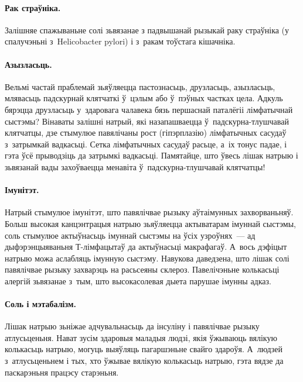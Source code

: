 \paragraph{Рак страўніка.}
Залішняе спажываньне солі зьвязанае з падвышанай рызыкай раку страўніка (у спалучэньні з~He\-li\-co\-bac\-ter pylori) і з~ракам тоўстага кішачніка.

\paragraph{Азызласьць.}
Вельмі частай праблемай зьяўляецца пастознасьць, друзласьць, азызласьць, млявасьць падскурнай клятчаткі ў~цэлым або ў~пэўных частках цела. Адкуль бярэцца друзласьць у~здаровага чалавека бязь першаснай паталёгіі лімфатычнай сыстэмы? Вінаваты залішні натрый, які назапашваецца ў~падскурна-тлушчавай клятчатцы, дзе стымулюе павялічаны рост (гіпэрплазію) лімфатычных сасудаў з~затрымкай вадкасьці. Сетка лімфатычных сасудаў расьце, а~іх тонус падае, і гэта ўсё прыводзіць да затрымкі вадкасьці. Памятайце, што ўвесь лішак натрыю і зьвязанай вады захоўваецца менавіта ў~падскурна-тлушчавай клятчатцы!


\paragraph{Імунітэт.}
Натрый стымулюе імунітэт, што павялічвае рызыку аўтаімунных захворваньняў. Больш высокая канцэнтрацыя натрыю зьяўляецца актыватарам імуннай сыстэмы, соль стымулюе актыўнасьць імуннай сыстэмы на ўсіх узроўнях~--- ад дыфэрэнцыяваньня Т-лімфацытаў да актыўнасьці макрафагаў. А~вось дэфіцыт натрыю можа аслабляць імунную сыстэму. Навукова даведзена, што лішак солі павялічвае рызыку захварэць на расьсеяны склероз. Павелічэньне колькасьці алергій зьвязанае з~тым, што высокасолевая дыета парушае імунны адказ.

\paragraph{Соль і мэтабалізм.}
Лішак натрыю зьніжае адчувальнасьць да інсуліну і павялічвае рызыку атлусьценьня. Нават зусім здаровыя маладыя людзі, якія ўжываюць вялікую колькасьць натрыю, могуць выяўляць пагаршэньне свайго здароўя. А~людзей з~атлусьценьнем і тых, хто ўжывае вялікую колькасьць натрыю, гэта вядзе да паскарэньня працэсу старэньня.

